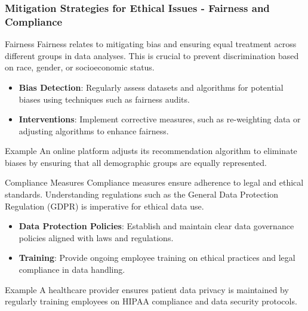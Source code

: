 \documentclass[aspectratio=169]{beamer}
\begin{document}
\begin{frame}[fragile]
    \frametitle{Mitigation Strategies for Ethical Issues - Fairness and Compliance}
    \begin{block}{Fairness}
        Fairness relates to mitigating bias and ensuring equal treatment across different groups in data analyses. 
        This is crucial to prevent discrimination based on race, gender, or socioeconomic status.
    \end{block}
    
    \begin{itemize}
        \item \textbf{Bias Detection}: Regularly assess datasets and algorithms for potential biases using techniques such as fairness audits.
        \item \textbf{Interventions}: Implement corrective measures, such as re-weighting data or adjusting algorithms to enhance fairness.
    \end{itemize}
    
    \begin{block}{Example}
        An online platform adjusts its recommendation algorithm to eliminate biases by ensuring that all demographic groups are equally represented.
    \end{block}

    \vspace{2ex}
    
    \begin{block}{Compliance Measures}
        Compliance measures ensure adherence to legal and ethical standards. Understanding regulations such as the General Data Protection Regulation (GDPR) is imperative for ethical data use.
    \end{block}

    \begin{itemize}
        \item \textbf{Data Protection Policies}: Establish and maintain clear data governance policies aligned with laws and regulations.
        \item \textbf{Training}: Provide ongoing employee training on ethical practices and legal compliance in data handling.
    \end{itemize}
    
    \begin{block}{Example}
        A healthcare provider ensures patient data privacy is maintained by regularly training employees on HIPAA compliance and data security protocols.
    \end{block}
\end{frame}
\end{document}
